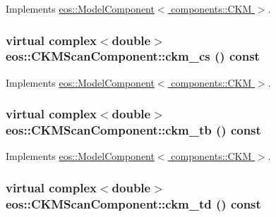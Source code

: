 Implements \hyperlink{classeos_1_1ModelComponent_3_01components_1_1CKM_01_4_a91f57e4ea6a4072d25e533a424cb0373}{eos::ModelComponent$<$ components::CKM $>$}.\hypertarget{classeos_1_1CKMScanComponent_adb49ab08f60bdd5de0fccb3748cacf03}{
\subsubsection[{ckm\_\-cs}]{\setlength{\rightskip}{0pt plus 5cm}virtual complex$<$double$>$ eos::CKMScanComponent::ckm\_\-cs () const}}
\label{classeos_1_1CKMScanComponent_adb49ab08f60bdd5de0fccb3748cacf03}


Implements \hyperlink{classeos_1_1ModelComponent_3_01components_1_1CKM_01_4_a9d537c64b4c3379d4a7ebd8ccc815a7e}{eos::ModelComponent$<$ components::CKM $>$}.\hypertarget{classeos_1_1CKMScanComponent_af171390d63478b601257163ce568f819}{
\subsubsection[{ckm\_\-tb}]{\setlength{\rightskip}{0pt plus 5cm}virtual complex$<$double$>$ eos::CKMScanComponent::ckm\_\-tb () const}}
\label{classeos_1_1CKMScanComponent_af171390d63478b601257163ce568f819}


Implements \hyperlink{classeos_1_1ModelComponent_3_01components_1_1CKM_01_4_a047bf55d51bf31e6b3a00777e7986613}{eos::ModelComponent$<$ components::CKM $>$}.\hypertarget{classeos_1_1CKMScanComponent_aeb3351313d4c06d21f5d70431b835c5e}{
\subsubsection[{ckm\_\-td}]{\setlength{\rightskip}{0pt plus 5cm}virtual complex$<$double$>$ eos::CKMScanComponent::ckm\_\-td () const}}
\label{classeos_1_1CKMScanComponent_aeb3351313d4c06d21f5d70431b835c5e}


